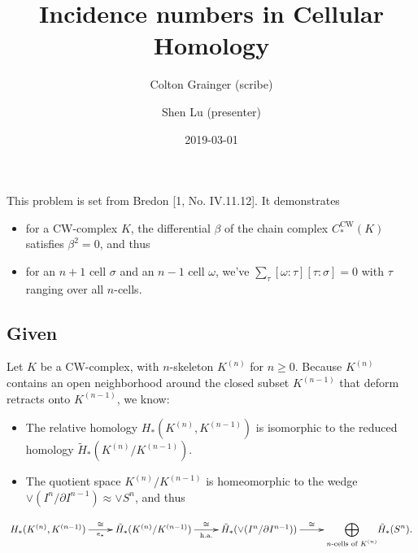 \documentclass[10pt]{amsart}
\title{Incidence numbers in Cellular Homology}
\author{Colton Grainger (scribe) \and Shen Lu (presenter)}
\date{2019-03-01}
\let\subsubsection\subsection
\let\subsection\section
\let\section\chapter
\let\chapter\part
\providecommand{\tightlist}{%
  \setlength{\itemsep}{0pt}\setlength{\parskip}{0pt}}
\begin{document}
\maketitle



\providecommand{\ccw}{C^{\text{CW}}}
\providecommand{\k}[1]{K^{( #1 )}}
\renewcommand{\deg}[1]{\operatorname{deg}\left( #1 \right)}
\newcommand{\defeq}{\stackrel{\text{def}}{=}}

This problem is set from Bredon {[}1, No. IV.11.12{]}. It demonstrates

\begin{itemize}
\tightlist
\item
  for a CW-complex \(K\), the differential \(\beta\) of the chain
  complex \(C^{\text{CW}}_*(K)\) satisfies \(\beta^2 =0\), and thus
\item
  for an \(n+1\) cell \(\sigma\) and an \(n-1\) cell \(\omega\), we've
  \(\sum_\tau [\omega : \tau][\tau : \sigma] = 0\) with \(\tau\) ranging
  over all \(n\)-cells.
\end{itemize}

\subsubsection{Given}

Let \(K\) be a CW-complex, with \(n\)-skeleton \(K^{( n )}\) for
\(n \ge 0\). Because \(K^{( n )}\) contains an open neighborhood around
the closed subset \(K^{( n-1 )}\) that deform retracts onto
\(K^{( n-1 )}\), we know:

\begin{itemize}
\tightlist
\item
  The relative homology \(H_*(K^{( n )}, K^{( n-1 )})\) is isomorphic to
  the reduced homology \(\tilde{H}_*(K^{( n )} / K^{( n-1 )})\).
\item
  The quotient space \(K^{( n )} / K^{( n-1 )}\) is homeomorphic to the
  wedge \(\vee ( I^n/\partial I^{n-1} ) \approx \vee S^n\), and thus
\end{itemize}

\begin{equation}
\xymatrix{
H_*(K^{( n )} , K^{( n-1 )}) \ar[r]^-{\cong}_-{e_*}
    & \tilde{H}_*(K^{( n )} / K^{( n-1 )}) \ar[r]^-{\cong}_-{\text{h.a.}}
    & \tilde{H}_*(\vee ( I^n/\partial I^{n-1} )) \ar[r]^-\cong
    & \displaystyle{ \bigoplus_\text{$n$-cells of $K^{( n )}$} } \tilde H_*(S^n).
}
\label{eq:ncells}
\end{equation}
\end{document}
